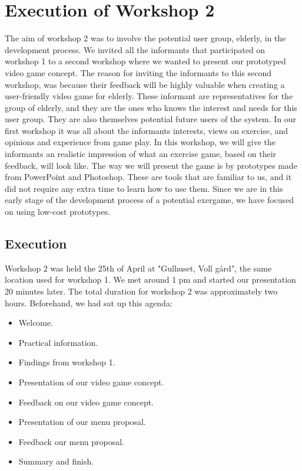 \chapter{Execution of Workshop 2}
The aim of workshop 2 was to involve the potential user group, elderly, in the development process. We invited all the informants that participated on workshop 1 to a second workshop where we wanted to present our prototyped video game concept. The reason for inviting the informants to this second workshop, was because their feedback will be highly valuable when creating a user-friendly video game for elderly. These informant are representatives for the group of elderly, and they are the ones who knows the interest and needs for this user group. They are also themselves potential future users of the system. In our first workshop it was all about the informants interests, views on exercise, and opinions and experience from game play. In this workshop, we will give the informants an realistic impression of what an exercise game, based on their feedback, will look like. The way we will present the game is by prototypes made from PowerPoint and Photoshop. These are tools that are familiar to us, and it did not require any extra time to learn how to use them. Since we are in this early stage of the development process of a potential exergame, we have focused on using low-cost prototypes.  


\section{Execution}
Workshop 2 was held the 25th of April at "Gulhuset, Voll gård", the same location used for workshop 1. We met around 1 pm and started our presentation 20 minutes later. The total duration for workshop 2 was approximately two hours. Beforehand, we had sat up this agenda:

\begin{itemize}
\renewcommand{\labelitemi}{$\bullet$}
\item Welcome.
\item Practical information.
\item Findings from workshop 1.
\item Presentation of our video game concept.
\item Feedback on our video game concept.
\item Presentation of our menu proposal.
\item Feedback our menu proposal.
\item Summary and finish.
\end{itemize}

